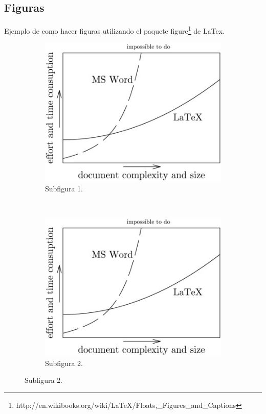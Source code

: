 \subsection{Figuras}
Ejemplo de como hacer figuras utilizando el paquete figure\footnote{http://en.wikibooks.org/wiki/LaTeX/Floats,\_Figures\_and\_Captions} de LaTex.
\begin{figure}[H]
    \centering
    \begin{subfigure}[b]{0.225\textwidth}
            \includegraphics[width=\textwidth]{../book/capitulo-ej/graphics/ejemplo-1.jpg}
            \caption{Subfigura 1.}
    \end{subfigure}
    ~~~~
    \begin{subfigure}[b]{0.225\textwidth}
            \includegraphics[width=\textwidth]{../book/capitulo-ej/graphics/ejemplo-1.jpg}
            \caption{Subfigura 2.}


\end{subfigure}
\end{figure}
